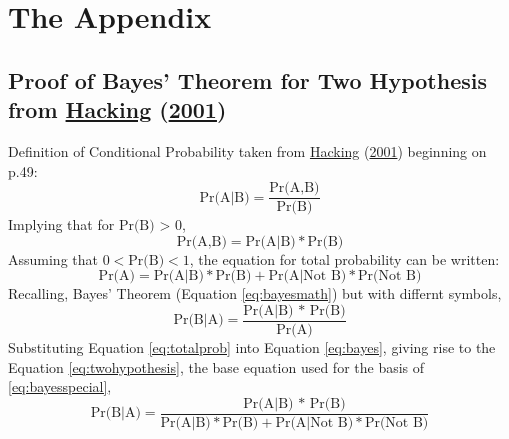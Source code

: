 \documentclass[12pt,twoside]{reedthesis}
\begin{document}
\appendix

\hypertarget{the-appendix}{%
\chapter{The Appendix}\label{the-appendix}}

\hypertarget{proof-of-bayes-theorem-for-two-hypothesis-from-hackingintroductionprobabilityinductive2001}{%
\section{\texorpdfstring{Proof of Bayes' Theorem for Two Hypothesis from \protect\hyperlink{ref-hackingIntroductionProbabilityInductive2001}{Hacking} (\protect\hyperlink{ref-hackingIntroductionProbabilityInductive2001}{2001})}{Proof of Bayes' Theorem for Two Hypothesis from Hacking (2001)}}\label{proof-of-bayes-theorem-for-two-hypothesis-from-hackingintroductionprobabilityinductive2001}}

Definition of Conditional Probability taken from \protect\hyperlink{ref-hackingIntroductionProbabilityInductive2001}{Hacking} (\protect\hyperlink{ref-hackingIntroductionProbabilityInductive2001}{2001}) beginning on p.49:
\begin{equation}
\text{Pr(A|B)}= \frac{\text{Pr(A,B)}}{\text{Pr(B)}} 
\label{eq:conditionalprob}
\end{equation}
Implying that for \(\text{Pr(B) > 0}\),
\begin{equation}
\text{Pr(A,B)} = \text{Pr(A|B)} * \text{Pr(B)}
\label{eq:conditionalprobproof1}
\end{equation}
Assuming that \(0 < \text{Pr(B)} < 1\), the equation for total probability can be written:
\begin{equation}
\text{Pr(A)} = \text{Pr(A|B)} * \text{Pr(B)} + \text{Pr(A|Not B)} * \text{Pr(Not B)}
\label{eq:totalprob}
\end{equation}
Recalling, Bayes' Theorem (Equation \eqref{eq:bayesmath}) but with differnt symbols,
\begin{equation}
\text{Pr(B|A)}= \frac{\text{Pr(A|B) * Pr(B)}}{\text{Pr(A)}} 
\label{eq:bayes}
\end{equation}
Substituting Equation \eqref{eq:totalprob} into Equation \eqref{eq:bayes}, giving rise to the Equation \eqref{eq:twohypothesis}, the base equation used for the basis of \eqref{eq:bayesspecial},
\begin{equation}
\text{Pr(B|A)}= \frac{\text{Pr(A|B) * Pr(B)}}{\text{Pr(A|B)} * \text{Pr(B)} + \text{Pr(A|Not B)} * \text{Pr(Not B)}} 
\label{eq:twohypothesis}
\end{equation}
\backmatter
\end{document}
